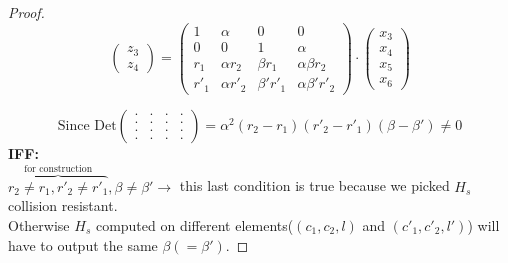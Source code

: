 \begin{proof}
\[\begin{pmatrix}
            z_3\\
            z_4
        \end{pmatrix}
        =
        \begin{pmatrix}
            1 & \alpha & 0 & 0 \\
            0 & 0 & 1 & \alpha \\
            r_1 & \alpha r_2 & \beta r_1 & \alpha\beta r_2 \\
            r'_1 & \alpha r'_2 & \beta' r'_1 & \alpha\beta' r'_2
        \end{pmatrix}
        \cdot
        \begin{pmatrix}
            x_3\\
            x_4\\
            x_5\\
            x_6
        \end{pmatrix}
    \]

    \[ \text{Since Det}
    \begin{pmatrix}
        .&.&.&. \\
        .&.&.&.\\
        .&.&.&.\\
        .&.&.&. 
    \end{pmatrix}=
    \alpha^2(r_2-r_1)(r'_2-r'_1)(\beta-\beta')\neq 0
    \]
    \centering\textbf{IFF:}\\
    $\overbrace{r_2\neq r_1 ,r'_2\neq r'_1}^{\text{for construction}},\beta \neq \beta' \rightarrow$ this last condition is true because we picked $H_s$ collision resistant.\\
    Otherwise $H_s$ computed on different elements($(c_1,c_2,l)$ and $(c'_1,c'_2,l')$) will have to output the same $\beta( = \beta')$.
\end{proof}